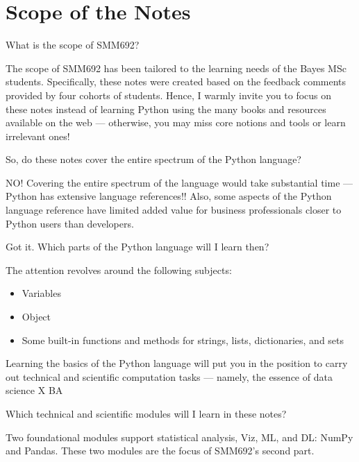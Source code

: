 \documentclass[a4paper,11pt]{book}
\newcommand{\question}[1]{%
    \begin{tcolorbox}[colback=comp_c!10,colframe=comp_c,sidebyside align=top,width=\linewidth,before skip=1ex]
        #1
    \end{tcolorbox}
    \switchcolumn%
}
\newcommand{\note}[1]{%
    \begin{tcolorbox}[colback=white!0,colframe=white!10,width=\linewidth,before skip=1ex]
        #1
    \end{tcolorbox}
}
\begin{document}
\section{Scope of the Notes}

\begin{paracol}{2}
	\question{\raggedright What is the scope of SMM692?}
	\note{The scope of SMM692 has been tailored to the learning needs of the Bayes MSc students. Specifically, these notes were created based on the feedback comments provided by four cohorts of students. Hence, I warmly invite you to focus on these notes instead of learning Python using the many books and resources available on the web --- otherwise, you may miss core notions and tools or learn irrelevant ones!
	}
\end{paracol}
\clearpage

\begin{paracol}{2}
	\question{\raggedright So, do these notes cover the entire spectrum of the Python language?}	
	\note{NO! Covering the entire spectrum of the language would take substantial time --- Python has extensive language references!! Also, some aspects of the Python language reference have limited added value for business professionals closer to Python users than developers.
	}
\end{paracol}

\begin{paracol}{2}
	\question{\raggedright Got it. Which parts of the Python language will I learn then?}
	\note{

	The attention revolves around the following subjects:

		\begin{itemize}
			\item Variables
			\item Object
			\item Some built-in functions and methods for strings, lists, dictionaries, and sets
		\end{itemize}
	
	\quad Learning the basics of the Python language will put you in the position to carry out technical and scientific computation tasks --- namely, the essence of data science X BA
	}
\end{paracol}

\begin{paracol}{2}
	\question{\raggedright Which technical and scientific modules will I learn in these notes?}
	\note{Two foundational modules support statistical analysis, Viz, ML, and DL: NumPy and Pandas. These two modules are the focus of SMM692's second part.
	}
\end{paracol}
\end{document}
